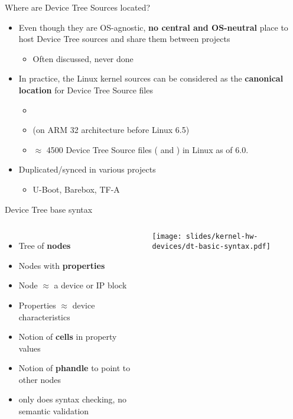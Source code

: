 \begin{frame}{Where are Device Tree Sources located?}
  \begin{itemize}
  \item Even though they are OS-agnostic, {\bf no central and
      OS-neutral} place to host Device Tree sources and share them
    between projects
    \begin{itemize}
    \item Often discussed, never done
    \end{itemize}
  \item In practice, the Linux kernel sources can be considered as the
    {\bf canonical location} for Device Tree Source files
    \begin{itemize}
    \item {}
    \item {} (on ARM 32 architecture before Linux 6.5)
    \item $\approx$ 4500 Device Tree Source files ( and
          ) in Linux as of 6.0.
    \end{itemize}
  \item Duplicated/synced in various projects
    \begin{itemize}
    \item U-Boot, Barebox, TF-A
    \end{itemize}
  \end{itemize}
\end{frame}

\begin{frame}{Device Tree base syntax}
  \begin{columns}
    \begin{itemize}
    \item Tree of {\bf nodes}
    \item Nodes with {\bf properties}
    \item Node $\approx$ a device or IP block
    \item Properties $\approx$ device characteristics
    \item Notion of {\bf cells} in property values
    \item Notion of {\bf phandle} to point to other nodes
    \item {} only does syntax checking, no semantic validation
    \end{itemize}
    \begin{center}
      \texttt{[image: slides/kernel-hw-devices/dt-basic-syntax.pdf]}
    \end{center}
  \end{columns}
\end{frame}


